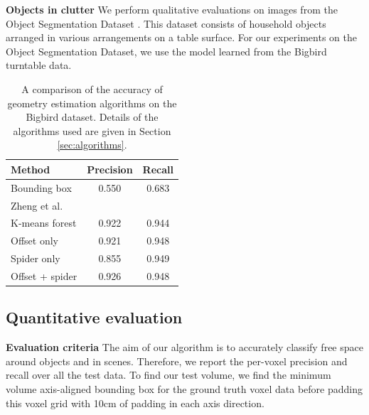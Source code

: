 \documentclass[10pt,twocolumn,letterpaper]{article}
\makeatletter
\newcommand*{\ea}{et al.\@\xspace}
\renewcommand{\paragraph}{\vspace{2pt}\noindent\textbf}
\makeatother
\begin{document}
\paragraph{Objects in clutter}
We perform qualitative evaluations on images from the Object Segmentation Dataset \cite{richtsfeld-iros-2012}.
This dataset consists of household objects arranged in various arrangements on a table surface.
For our experiments on the Object Segmentation Dataset, we use the model learned from the Bigbird turntable data.



\begin{table}
  \centering
  \begin{tabular}{p{2.6cm}cc}
  \toprule
  \textbf{Method}  &   \textbf{Precision} & \textbf{Recall} \\
  \midrule
  Bounding box & 0.550 & 0.683  \\
  Zheng \ea \cite{zheng-cvpr-2013}  &  &  \\
  K-means forest & 0.922 & 0.944 \\
  Offset only & 0.921 & 0.948 \\
  Spider only &  0.855 & 0.949 \\
  Offset + spider & 0.926 & 0.948 \\
  \bottomrule
  \end{tabular}
  \vspace{5pt}
  \caption{A comparison of the accuracy of geometry estimation algorithms on the Bigbird dataset. Details of the algorithms used are given in Section \ref{sec:algorithms}.}
    \label{tab:quant_results}
\end{table}


\subsection{Quantitative evaluation}

\paragraph{Evaluation criteria}
The aim of our algorithm is to accurately classify free space around objects and in scenes.
Therefore, we report the per-voxel precision and recall over all the test data.
To find our test volume, we find the minimum volume axis-aligned bounding box for the ground truth voxel data before padding this voxel grid with 10cm of padding in each axis direction.
\end{document}
